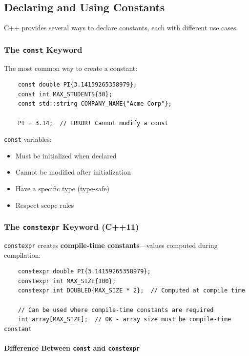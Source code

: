 \subsection{Declaring and Using Constants}

C++ provides several ways to declare constants, each with different use cases.

\subsubsection{The \texttt{const} Keyword}

The most common way to create a constant:

\begin{lstlisting}
	const double PI{3.14159265358979};
	const int MAX_STUDENTS{30};
	const std::string COMPANY_NAME{"Acme Corp"};
	
	PI = 3.14;  // ERROR! Cannot modify a const
\end{lstlisting}

\texttt{const} variables:
\begin{itemize}
	\item Must be initialized when declared
	\item Cannot be modified after initialization
	\item Have a specific type (type-safe)
	\item Respect scope rules
\end{itemize}

\subsubsection{The \texttt{constexpr} Keyword (C++11)}

\texttt{constexpr} creates \textbf{compile-time constants}—values computed during compilation:

\begin{lstlisting}
	constexpr double PI{3.14159265358979};
	constexpr int MAX_SIZE{100};
	constexpr int DOUBLED{MAX_SIZE * 2};  // Computed at compile time
	
	// Can be used where compile-time constants are required
	int array[MAX_SIZE];  // OK - array size must be compile-time constant
\end{lstlisting}

\paragraph{Difference Between \texttt{const} and \texttt{constexpr}}

